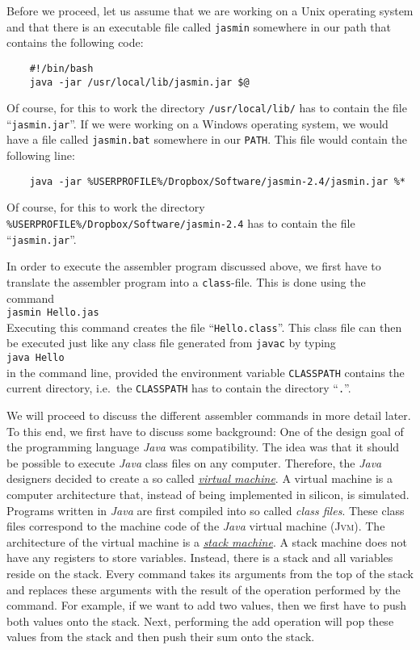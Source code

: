 Before we proceed, let us assume that we are working on a Unix operating system and that there is an
executable file called \texttt{jasmin} somewhere in our path that contains the following code:
\begin{verbatim}
    #!/bin/bash 
    java -jar /usr/local/lib/jasmin.jar $@
\end{verbatim}
Of course, for this to work the directory \texttt{/usr/local/lib/} has to contain the file
``\texttt{jasmin.jar}''.  If we were working on a Windows operating system, we would have a file
called \texttt{jasmin.bat} somewhere in our \texttt{PATH}.  This file would contain the following
line:
\begin{verbatim}
    java -jar %USERPROFILE%/Dropbox/Software/jasmin-2.4/jasmin.jar %*
\end{verbatim}
Of course, for this to work the directory \texttt{\%USERPROFILE\%/Dropbox/Software/jasmin-2.4}
has to contain the file ``\texttt{jasmin.jar}''.

In order to execute the assembler program discussed above, we first have to translate the assembler
program into a \texttt{class}-file.  This is done using the command
\\[0.2cm]
\hspace*{1.3cm}
\texttt{jasmin Hello.jas}
\\[0.2cm]
Executing this command creates the file ``\texttt{Hello.class}''.  This class file
can then be executed just like any class file generated from \texttt{javac} by typing
\\[0.2cm]
\hspace*{1.3cm}
\texttt{java Hello}
\\[0.2cm]
in the command line, provided the environment variable \texttt{CLASSPATH} contains the current
directory, i.e.~the \texttt{CLASSPATH} has to contain the directory ``\texttt{.}''.

We will proceed to discuss the different assembler commands in more detail later.  To this end, we
first have to discuss some background: One of the design goal of the programming language
\textsl{Java} was compatibility.  The idea was 
that it should be possible to execute \textsl{Java} class files on any computer.  Therefore, the
\textsl{Java} designers decided to create a so called 
\href{http://en.wikipedia.org/wiki/Virtual_machine}{\emph{virtual machine}}.  A virtual machine is
a computer architecture that, instead of being implemented in silicon, is simulated. 
Programs written in \textsl{Java} are first compiled into so called \emph{class files}.  These class
files correspond to the machine code of the \textsl{Java} virtual machine (\textsc{Jvm}).  
The architecture of the virtual machine is a 
\href{http://en.wikipedia.org/wiki/Stack_machine}{\emph{stack machine}}. 
A stack machine does not have any registers to store variables.  Instead, there is a stack and all
variables reside on the stack.  Every command takes its arguments from the top of the stack and
replaces these arguments with the result of the operation performed by the command.
For example, if we want to add two values, then we first have to
push both values onto the stack.  Next, performing the add operation will pop these values from the
stack and then push their sum onto the stack.


